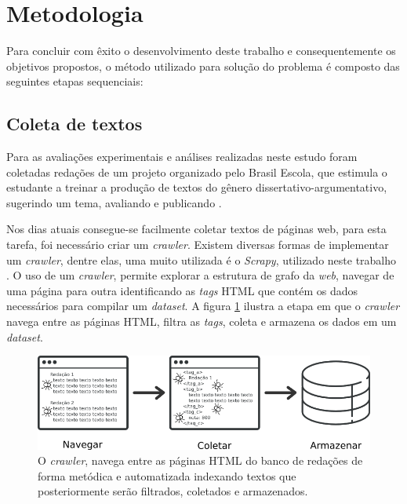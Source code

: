 \section{Metodologia}

Para concluir com êxito o desenvolvimento deste trabalho e consequentemente os 
objetivos propostos, o método utilizado para solução do problema é composto das 
seguintes etapas sequenciais:

\subsection{Coleta de textos}

Para as 
avaliações experimentais e análises realizadas neste estudo foram coletadas 
redações de um projeto organizado pelo Brasil Escola, que estimula o estudante 
a treinar a produção de textos do gênero dissertativo-argumentativo, sugerindo 
um tema, avaliando e publicando \cite{brasil_escola}. 

Nos dias atuais consegue-se facilmente coletar textos de páginas web, para esta 
tarefa, foi necessário criar um  \textit{crawler}. Existem diversas formas de 
implementar um \textit{crawler}, dentre elas, uma muito utilizada é o 
\textit{Scrapy}, utilizado neste trabalho \cite{scrapy}. O uso de um 
\textit{crawler}, permite explorar a estrutura de grafo da \textit{web}, 
navegar de uma página para outra identificando as \textit{tags} HTML que contém 
os dados necessários para compilar um \textit{dataset}. A figura 
\ref{figure:metodologia_1} ilustra a etapa em que o \textit{crawler} navega 
entre as páginas HTML, filtra as \textit{tags}, coleta e armazena os dados em 
um \textit{dataset}.

\begin{figure}[H]
\begin{center}
    \includegraphics[scale=0.70]{images/metodologia_1.png}
\end{center}
\caption{O \textit{crawler}, navega entre as páginas HTML do banco de redações 
de forma metódica e automatizada indexando textos que posteriormente serão 
filtrados, coletados e armazenados.}
\label{figure:metodologia_1}
\end{figure}

